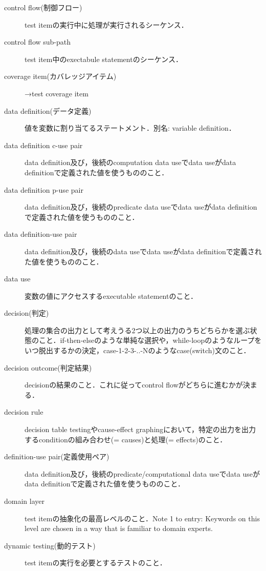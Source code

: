 \begin{description}
    \item[control flow(制御フロー)]test itemの実行中に処理が実行されるシーケンス．
    \item[control flow sub-path]test item中のexectabule statementのシーケンス．
    \item[coverage item(カバレッジアイテム)]→test coverage item
    \item[data definition(データ定義)]値を変数に割り当てるステートメント．別名: variable definition．
    \item[data definition c-use pair]data definition及び，後続のcomputation data useでdata useがdata definitionで定義された値を使うもののこと．
    \item[data definition p-use pair]data definition及び，後続のpredicate data useでdata useがdata definitionで定義された値を使うもののこと．
    \item[data definition-use pair]data definition及び，後続のdata useでdata useがdata definitionで定義された値を使うもののこと．
    \item[data use]変数の値にアクセスするexecutable statementのこと．
    \item[decision(判定)]処理の集合の出力として考えうる2つ以上の出力のうちどちらかを選ぶ状態のこと．if-then-elseのような単純な選択や，while-loopのようなループをいつ脱出するかの決定，case-1-2-3-..-Nのようなcase(switch)文のこと．
    \item[decision outcome(判定結果)]decisionの結果のこと．これに従ってcontrol flowがどちらに進むかが決まる．
    \item[decision rule]decision table testingやcause-effect graphingにおいて，特定の出力を出力するconditionの組み合わせ(= causes)と処理(= effects)のこと．
    \item[definition-use pair(定義使用ペア)]data definition及び，後続のpredicate/computational data useでdata useがdata definitionで定義された値を使うもののこと．
    \item[domain layer]test itemの抽象化の最高レベルのこと．Note 1 to entry: Keywords on this level are chosen in a way that is familiar to domain experts.
    \item[dynamic testing(動的テスト)]test itemの実行を必要とするテストのこと．

\end{description}
